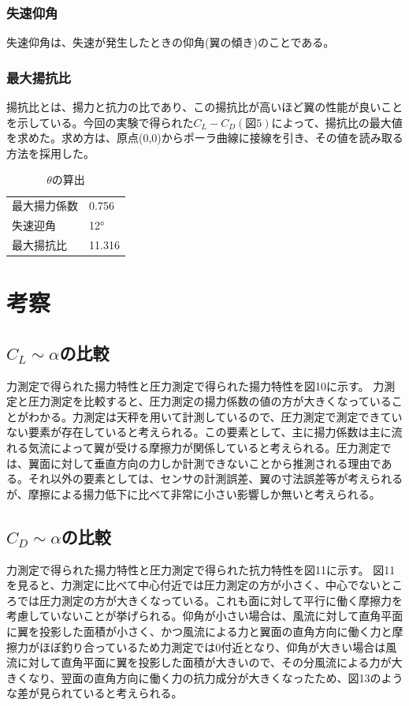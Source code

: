 \documentclass[a4j,twoside,openright,11pt]{jarticle}
\begin{document}
\subsubsection{失速仰角}
失速仰角は、失速が発生したときの仰角(翼の傾き)のことである。
\subsubsection{最大揚抗比}
揚抗比とは、揚力と抗力の比であり、この揚抗比が高いほど翼の性能が良いことを示している。今回の実験で得られた$C_L-C_D(図5)$によって、揚抗比の最大値を求めた。求め方は、原点(0,0)からポーラ曲線に接線を引き、その値を読み取る方法を採用した。

\begin{table}[htb]
\begin{center}
  \caption{$\theta$の算出}
  \begin{tabular}{ll} \hline
最大揚力係数 &0.756\\
失速迎角     &12°\\
最大揚抗比   &11.316\\
\hline
  \end{tabular}
\end{center}
\end{table}

\section{考察}
\subsection{$C_L \sim \alpha$の比較}
力測定で得られた揚力特性と圧力測定で得られた揚力特性を図10に示す。
力測定と圧力測定を比較すると、圧力測定の揚力係数の値の方が大きくなっていることがわかる。力測定は天秤を用いて計測しているので、圧力測定で測定できていない要素が存在していると考えられる。この要素として、主に揚力係数は主に流れる気流によって翼が受ける摩擦力が関係していると考えられる。圧力測定では、翼面に対して垂直方向の力しか計測できないことから推測される理由である。それ以外の要素としては、センサの計測誤差、翼の寸法誤差等が考えられるが、摩擦による揚力低下に比べて非常に小さい影響しか無いと考えられる。

\subsection{$C_D \sim \alpha$の比較}
力測定で得られた揚力特性と圧力測定で得られた抗力特性を図11に示す。
図11を見ると、力測定に比べて中心付近では圧力測定の方が小さく、中心でないところでは圧力測定の方が大きくなっている。これも面に対して平行に働く摩擦力を考慮していないことが挙げられる。仰角が小さい場合は、風流に対して直角平面に翼を投影した面積が小さく、かつ風流による力と翼面の直角方向に働く力と摩擦力がほぼ釣り合っているため力測定では0付近となり、仰角が大きい場合は風流に対して直角平面に翼を投影した面積が大きいので、その分風流による力が大きくなり、翌面の直角方向に働く力の抗力成分が大きくなったため、図13のような差が見られていると考えられる。
\end{document}
